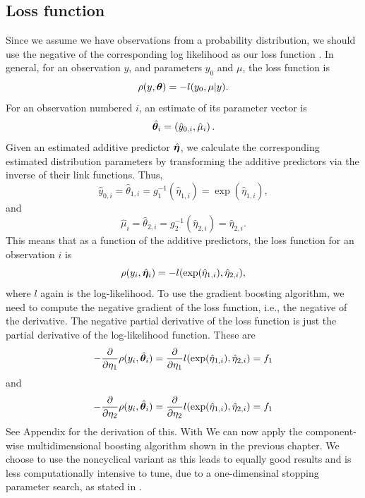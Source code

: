 \subsection{Loss function}
Since we assume we have observations from a probability distribution, we should use the negative of the corresponding log likelihood as our loss function \citep{mayr14a}.
In general, for an observation $y$, and parameters $y_0$ and $\mu$, the loss function is
\begin{equation*}
    \rho(y,\boldsymbol{\theta})=-l(y_{0},\mu|y).
\end{equation*}
For an observation numbered $i$, an estimate of its parameter vector is
\begin{equation*}
    \hat{\boldsymbol{\theta}}_i=\left(\hat{y}_{0,i},\hat{\mu}_i\right).
\end{equation*}
Given an estimated additive predictor $\hat{\boldsymbol{\eta}}$, we calculate the corresponding estimated distribution parameters by transforming the additive predictors via the inverse of their link functions.
Thus,
\begin{equation}
    \hat{y}_{0,i}=\hat{\theta}_{1,i}=g_1^{-1}(\hat{\eta}_{1,i})=\exp(\hat{\eta}_{1,i}),
\end{equation}
and
\begin{equation}
    \hat{\mu}_i=\hat{\theta}_{2,i}=g_2^{-1}(\hat{\eta}_{2,i})=\hat{\eta}_{2,i}.
\end{equation}
This means that as a function of the additive predictors, the loss function for an observation $i$ is
\begin{equation*}
    \rho(y_i,\hat{\boldsymbol{\eta}}_i)=-l(\exp(\hat{\eta}_{1,i}), \hat{\eta}_{2,i}),
\end{equation*}
where $l$ again is the log-likelihood.
To use the gradient boosting algorithm, we need to compute the negative gradient of the loss function, i.e., the negative of the derivative. 
The negative partial derivative of the loss function is just the partial derivative of the log-likelihood function.
These are
\begin{equation}
    -\frac{\partial}{\partial\eta_1}\rho(y_i,\hat{\boldsymbol{\theta}}_i)=\frac{\partial}{\partial\eta_1}l(\exp(\hat{\eta}_{1,i}), \hat{\eta}_{2,i})=f_1
\end{equation}
and
\begin{equation}
    -\frac{\partial}{\partial\eta_2}\rho(y_i,\hat{\boldsymbol{\theta}}_i)=\frac{\partial}{\partial\eta_2}l(\exp(\hat{\eta}_{1,i}), \hat{\eta}_{2,i})=f_1
\end{equation}
See Appendix for the derivation of this.
With
We can now apply the component-wise multidimensional boosting algorithm shown in the previous chapter.
We choose to use the noncyclical variant as this leads to equally good results and is less computationally intensive to tune, due to a one-dimensinal stopping parameter search, as stated in \citet{schmid}.

